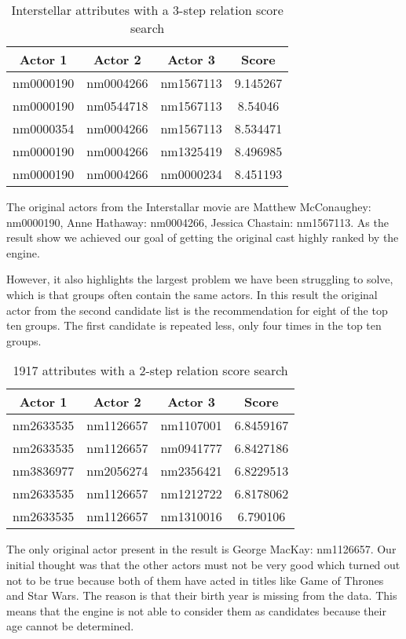 \begin{table}
\centering
    \begin{tabular}{ |c|c|c|c| } 
        \hline
        \textbf{Actor 1} & \textbf{Actor 2} & \textbf{Actor 3} & \textbf{Score} \\ 
        \hline
        nm0000190 & nm0004266 & nm1567113  & 9.145267 \\ 
        nm0000190 & nm0544718 & nm1567113  & 8.54046 \\ 
        nm0000354 & nm0004266 & nm1567113  & 8.534471 \\ 
        nm0000190 & nm0004266 & nm1325419  & 8.496985 \\ 
        nm0000190 & nm0004266 & nm0000234  & 8.451193 \\ 
        \hline
    \end{tabular}
	\caption{Interstellar attributes with a 3-step relation score search}
	\label{tab:3-step relation score}
\end{table}

The original actors from the Interstallar movie are Matthew McConaughey: nm0000190, Anne Hathaway: nm0004266, Jessica Chastain: nm1567113. As the result show we achieved our goal of getting the original cast highly ranked by the engine.

However, it also highlights the largest problem we have been struggling to solve, which is that groups often contain the same actors. In this result the original actor from the second candidate list is the recommendation for eight of the top ten groups. The first candidate is repeated less, only four times in the top ten groups.


\begin{table}
	\centering
    \begin{tabular}{ |c|c|c|c| } 
        \hline
        \textbf{Actor 1} & \textbf{Actor 2} & \textbf{Actor 3} & \textbf{Score} \\ 
        \hline
        nm2633535 & nm1126657 & nm1107001  & 6.8459167 \\ 
        nm2633535 & nm1126657 & nm0941777  & 6.8427186 \\ 
        nm3836977 & nm2056274 & nm2356421 & 6.8229513 \\ 
        nm2633535 & nm1126657 & nm1212722  & 6.8178062 \\ 
        nm2633535 & nm1126657 & nm1310016  & 6.790106 \\ 
        \hline
    \end{tabular}
\caption{1917 attributes with a 2-step relation score search}
\label{tab:2-step relation score}
\end{table}

The only original actor present in the result is George MacKay: nm1126657. Our initial thought was that the other actors must not be very good which turned out not to be true because both of them have acted in titles like Game of Thrones and Star Wars. The reason is that their birth year is missing from the data. This means that the engine is not able to consider them as candidates because their age cannot be determined.